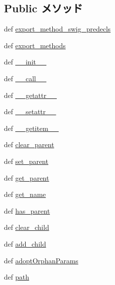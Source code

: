 \subsection*{Public メソッド}
\begin{DoxyCompactItemize}
\item 
def \hyperlink{classm5_1_1SimObject_1_1SimObject_ac19f60f4d41b7b37c7f282db24e5d743}{export\_\-method\_\-swig\_\-predecls}
\item 
def \hyperlink{classm5_1_1SimObject_1_1SimObject_ab373c5eaef9a7b80491a097389260f4a}{export\_\-methods}
\item 
def \hyperlink{classm5_1_1SimObject_1_1SimObject_ac775ee34451fdfa742b318538164070e}{\_\-\_\-init\_\-\_\-}
\item 
def \hyperlink{classm5_1_1SimObject_1_1SimObject_ae844e0019d38360a86bac1474132db3c}{\_\-\_\-call\_\-\_\-}
\item 
def \hyperlink{classm5_1_1SimObject_1_1SimObject_a0a990b3ec3889d40889daca9ee5e4695}{\_\-\_\-getattr\_\-\_\-}
\item 
def \hyperlink{classm5_1_1SimObject_1_1SimObject_a6287b7a16286568d5442b6e2e90215b5}{\_\-\_\-setattr\_\-\_\-}
\item 
def \hyperlink{classm5_1_1SimObject_1_1SimObject_a50d766f4276c3d8fe330ac8cd344a75f}{\_\-\_\-getitem\_\-\_\-}
\item 
def \hyperlink{classm5_1_1SimObject_1_1SimObject_a087680f475bb0223aaae928a37e04c3e}{clear\_\-parent}
\item 
def \hyperlink{classm5_1_1SimObject_1_1SimObject_a625d1d3f49ccb2ff8aacebe992396065}{set\_\-parent}
\item 
def \hyperlink{classm5_1_1SimObject_1_1SimObject_a19ef6174bcc02d0e3400041dc20ae1f6}{get\_\-parent}
\item 
def \hyperlink{classm5_1_1SimObject_1_1SimObject_a2f3160d6b4e517398ca3f9e51b260bb7}{get\_\-name}
\item 
def \hyperlink{classm5_1_1SimObject_1_1SimObject_a71e011e66af177233516716c34212661}{has\_\-parent}
\item 
def \hyperlink{classm5_1_1SimObject_1_1SimObject_ab18a2b99a1199dc94ba38cbc13e0c1b9}{clear\_\-child}
\item 
def \hyperlink{classm5_1_1SimObject_1_1SimObject_a48c30f83f1eccba721c925bf31eb4d76}{add\_\-child}
\item 
def \hyperlink{classm5_1_1SimObject_1_1SimObject_a0b974da794b43621c358251cabf87f92}{adoptOrphanParams}
\item 
def \hyperlink{classm5_1_1SimObject_1_1SimObject_a4767b0796ffc0da267b28b3f24776d97}{path}

\end{DoxyCompactItemize}
